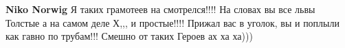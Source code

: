 \begin{itemize}
\begin{itemize}
\begin{itemize}
 
\textbf{Niko Norwig} Я таких грамотеев на смотрелся!!!! На словах вы все львы
Толстые а на самом деле Х,,, и простые!!!! Прижал вас в уголок, вы и поплыли
как гавно по трубам!!! Смешно от таких Героев ах ха ха)))
\end{itemize}

\end{itemize}

\end{itemize}

